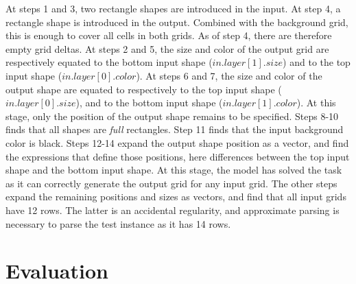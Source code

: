 \documentclass[a4paper]{llncs}
\begin{document}
At steps 1 and 3, two rectangle shapes are introduced in the input.
At step 4, a rectangle shape is introduced in the output. Combined
with the background grid, this is enough to cover all cells in both
grids. As of step 4, there are therefore empty grid deltas.
%
At steps 2 and 5, the size and color of the output grid are
respectively equated to the bottom input shape ($in.layer[1].size$)
and to the top input shape ($in.layer[0].color$). At steps 6 and 7,
the size and color of the output shape are equated to respectively to
the top input shape ($in.layer[0].size$), and to the bottom input
shape ($in.layer[1].color$). At this stage, only the position of the
output shape remains to be specified.
%
Steps 8-10 finds that all shapes are {\em full} rectangles. Step 11
finds that the input background color is black.
%
Steps 12-14 expand the output shape position as a vector, and find the
expressions that define those positions, here differences between the
top input shape and the bottom input shape.
%
At this stage, the model has solved the task as it can correctly
generate the output grid for any input grid.
%
The other steps expand the remaining positions and sizes as vectors,
and find that all input grids have 12 rows. The latter is an
accidental regularity, and approximate parsing is necessary to parse
the test instance as it has 14 rows.


\section{Evaluation}
\label{eval}
\end{document}
